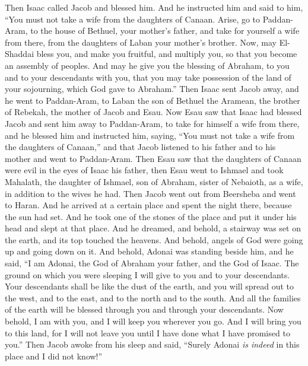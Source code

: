 \begin{biblechapter} %
 Then Isaac called Jacob and blessed him. And he instructed him and said to him, “You must not take a wife from the daughters of Canaan.
\verse Arise, go to Paddan-Aram, to the house of Bethuel, your mother’s father, and take for yourself a wife from there, from the daughters of Laban your mother’s brother.
\verse Now, may El-Shaddai bless you, and make you fruitful, and multiply you, so that you become an assembly of peoples.
\verse And may he give you the blessing of Abraham, to you and to your descendants with you, that you may take possession of the land of your sojourning, which God gave to Abraham.”
\verse Then Isaac sent Jacob away, and he went to Paddan-Aram, to Laban the son of Bethuel the Aramean, the brother of Rebekah, the mother of Jacob and Esau.
\verse Now Esau saw that Isaac had blessed Jacob and sent him away to Paddan-Aram, to take for himself a wife from there, and he blessed him and instructed him, saying, “You must not take a wife from the daughters of Canaan,”
\verse and that Jacob listened to his father and to his mother and went to Paddan-Aram.
\verse Then Esau saw that the daughters of Canaan were evil in the eyes of Isaac his father,
\verse then Esau went to Ishmael and took Mahalath, the daughter of Ishmael, son of Abraham, sister of Nebaioth, as a wife, in addition to the wives he had.
 Then Jacob went out from Beersheba and went to Haran.
\verse And he arrived at a certain place and spent the night there, because the sun had set. And he took one of the stones of the place and put it under his head and slept at that place.
\verse And he dreamed, and behold, a stairway was set on the earth, and its top touched the heavens. And behold, angels of God were going up and going down on it.
\verse And behold, Adonai was standing beside him, and he said, “I am Adonai, the God of Abraham your father, and the God of Isaac. The ground on which you were sleeping I will give to you and to your descendants.
\verse Your descendants shall be like the dust of the earth, and you will spread out to the west, and to the east, and to the north and to the south. And all the families of the earth will be blessed through you and through your descendants.
\verse Now behold, I am with you, and I will keep you wherever you go. And I will bring you to this land, for I will not leave you until I have done what I have promised to you.”
\verse Then Jacob awoke from his sleep and said, “Surely Adonai \textit{is indeed} in this place and I did not know!”

\end{biblechapter}
